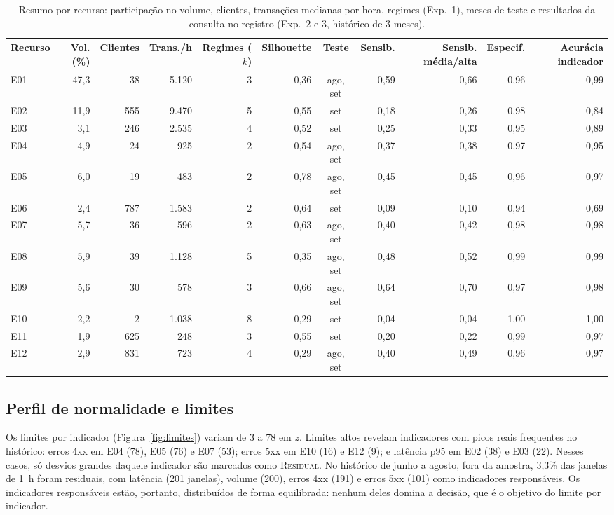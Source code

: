 \documentclass[sigconf,nonacm]{acmart}
\newcommand{\Residual}{\textsc{Residual}\xspace}
\begin{document}
\begin{table}[t]
  \caption{Resumo por recurso: participação no volume, clientes, transações medianas por hora, regimes (Exp.~1), meses de teste e resultados da consulta no registro (Exp.~2 e 3, histórico de 3 meses).}
  \label{tab:recursos}
  \small
  \begin{tabular}{lrrrrrcrrrr}
    \toprule
    Recurso & Vol. (\%) & Clientes & Trans./h & Regimes ($k$) & Silhouette & Teste & Sensib. & Sensib. média/alta & Especif. & Acurácia indicador \\
    \midrule
    E01 & 47,3 & 38  & 5.120 & 3 & 0,36 & ago, set & 0,59 & 0,66 & 0,96 & 0,99 \\
    E02 & 11,9 & 555 & 9.470 & 5 & 0,55 & set & 0,18 & 0,26 & 0,98 & 0,84 \\
    E03 & 3,1  & 246 & 2.535 & 4 & 0,52 & set & 0,25 & 0,33 & 0,95 & 0,89 \\
    E04 & 4,9  & 24  & 925   & 2 & 0,54 & ago, set & 0,37 & 0,38 & 0,97 & 0,95 \\
    E05 & 6,0  & 19  & 483   & 2 & 0,78 & ago, set & 0,45 & 0,45 & 0,96 & 0,97 \\
    E06 & 2,4  & 787 & 1.583 & 2 & 0,64 & set & 0,09 & 0,10 & 0,94 & 0,69 \\
    E07 & 5,7  & 36  & 596   & 2 & 0,63 & ago, set & 0,40 & 0,42 & 0,98 & 0,98 \\
    E08 & 5,9  & 39  & 1.128 & 5 & 0,35 & ago, set & 0,48 & 0,52 & 0,99 & 0,99 \\
    E09 & 5,6  & 30  & 578   & 3 & 0,66 & ago, set & 0,64 & 0,70 & 0,97 & 0,98 \\
    E10 & 2,2  & 2   & 1.038 & 8 & 0,29 & set & 0,04 & 0,04 & 1,00 & 1,00 \\
    E11 & 1,9  & 625 & 248   & 3 & 0,55 & set & 0,20 & 0,22 & 0,99 & 0,97 \\
    E12 & 2,9  & 831 & 723   & 4 & 0,29 & ago, set & 0,40 & 0,49 & 0,96 & 0,97 \\
    \bottomrule
  \end{tabular}
\end{table}

\subsection{Perfil de normalidade e limites}
Os limites por indicador (Figura~\ref{fig:limites}) variam de 3 a 78 em $z$. Limites altos revelam indicadores com picos reais frequentes no histórico: erros 4xx em E04 (78), E05 (76) e E07 (53); erros 5xx em E10 (16) e E12 (9); e latência p95 em E02 (38) e E03 (22). Nesses casos, só desvios grandes daquele indicador são marcados como \Residual. No histórico de junho a agosto, fora da amostra, 3,3\% das janelas de 1~h foram residuais, com latência (201 janelas), volume (200), erros 4xx (191) e erros 5xx (101) como indicadores responsáveis. Os indicadores responsáveis estão, portanto, distribuídos de forma equilibrada: nenhum deles domina a decisão, que é o objetivo do limite por indicador.
\end{document}
